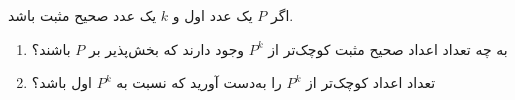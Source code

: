 \EXERCISE
اگر
$P$
یک عدد اول و
$k$
یک عدد صحیح مثبت باشد.
\begin{enumerate}
\item
به چه تعداد اعداد صحیح مثبت کوچک‌تر از
$P^k$
وجود دارند که بخش‌پذیر بر
$P$
باشند؟
\item
تعداد اعداد کوچک‌تر از
$P^k$
را به‌دست آورید که نسبت به
$P^k$
اول باشد؟
\end{enumerate}